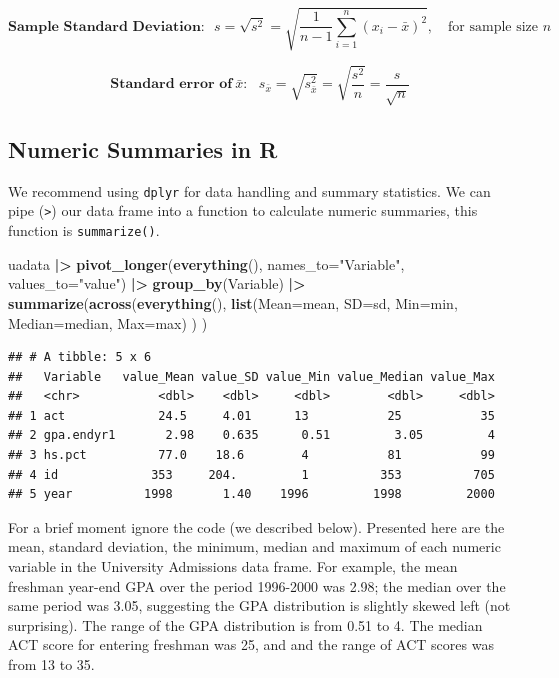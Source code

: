 \documentclass[
]{book}
\newenvironment{Shaded}{\begin{snugshade}}{\end{snugshade}}
\newcommand{\AttributeTok}[1]{\textcolor[rgb]{0.13,0.29,0.53}{#1}}
\newcommand{\FunctionTok}[1]{\textcolor[rgb]{0.13,0.29,0.53}{\textbf{#1}}}
\newcommand{\NormalTok}[1]{#1}
\newcommand{\SpecialCharTok}[1]{\textcolor[rgb]{0.81,0.36,0.00}{\textbf{#1}}}
\newcommand{\StringTok}[1]{\textcolor[rgb]{0.31,0.60,0.02}{#1}}
\begin{document}
\[\textbf{Sample Standard Deviation:}~~~ s = \sqrt{s^2} = \sqrt{\frac{1}{n-1}\sum_{i=1}^n (x_i - \bar{x})^2}, ~~~\textrm{ for sample size } n\]

\[\textbf{Standard error of}~ \bar{x}:~~~ s_{\bar{x}} = \sqrt{s^2_{\bar{x}}} = \sqrt{\frac{s^2}{n}} = \frac{s}{\sqrt{n}}\]

\hypertarget{numeric-summaries-in-r}{%
\subsection{Numeric Summaries in R}\label{numeric-summaries-in-r}}

We recommend using \texttt{dplyr} for data handling and summary statistics. We can pipe (\texttt{\textbar{}\textgreater{}}) our data frame into a function to calculate numeric summaries, this function is \texttt{summarize()}.

\begin{Shaded}
\begin{Highlighting}[]
\NormalTok{uadata }\SpecialCharTok{|\textgreater{}}
  \FunctionTok{pivot\_longer}\NormalTok{(}\FunctionTok{everything}\NormalTok{(), }\AttributeTok{names\_to=}\StringTok{"Variable"}\NormalTok{, }\AttributeTok{values\_to=}\StringTok{"value"}\NormalTok{) }\SpecialCharTok{|\textgreater{}} 
  \FunctionTok{group\_by}\NormalTok{(Variable) }\SpecialCharTok{|\textgreater{}}
  \FunctionTok{summarize}\NormalTok{(}\FunctionTok{across}\NormalTok{(}\FunctionTok{everything}\NormalTok{(), }
                   \FunctionTok{list}\NormalTok{(}\AttributeTok{Mean=}\NormalTok{mean, }\AttributeTok{SD=}\NormalTok{sd, }\AttributeTok{Min=}\NormalTok{min, }\AttributeTok{Median=}\NormalTok{median, }\AttributeTok{Max=}\NormalTok{max) ) )}
\end{Highlighting}
\end{Shaded}

\begin{verbatim}
## # A tibble: 5 x 6
##   Variable   value_Mean value_SD value_Min value_Median value_Max
##   <chr>           <dbl>    <dbl>     <dbl>        <dbl>     <dbl>
## 1 act             24.5     4.01      13           25           35
## 2 gpa.endyr1       2.98    0.635      0.51         3.05         4
## 3 hs.pct          77.0    18.6        4           81           99
## 4 id             353     204.         1          353          705
## 5 year          1998       1.40    1996         1998         2000
\end{verbatim}

For a brief moment ignore the code (we described below). Presented here are the mean, standard deviation, the minimum, median and maximum of each numeric variable in the University Admissions data frame. For example, the mean freshman year-end GPA over the period 1996-2000 was 2.98; the median over the same period was 3.05, suggesting the GPA distribution is slightly skewed left (not surprising). The range of the GPA distribution is from 0.51 to 4. The median ACT score for entering freshman was 25, and and the range of ACT scores was from 13 to 35.
\end{document}
